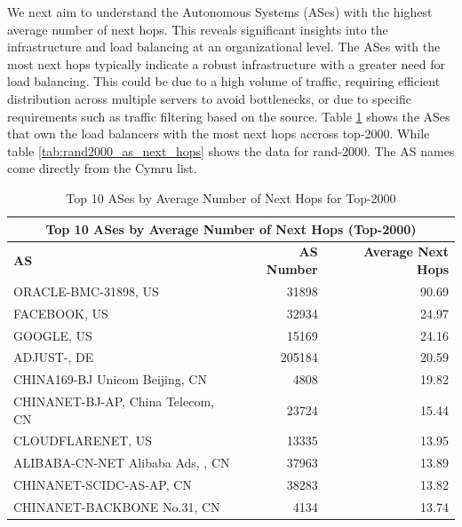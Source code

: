 \documentclass[12pt]{cwru_thesis}
\begin{document}
We next aim to understand the Autonomous Systems (ASes) with the highest average number of next hops.  This reveals significant insights into the infrastructure and load balancing at an organizational level.
The ASes with the most next hops typically indicate a robust infrastructure with a greater need for load balancing. This could be due to a high volume of traffic, requiring efficient distribution across multiple servers to avoid bottlenecks, or due to specific requirements such as traffic filtering based on the source. Table \ref{tab:top2000_as_next_hops} shows the ASes that own the load balancers with the most next hops accross top-2000. While table \ref{tab:rand2000_as_next_hops} shows the data for rand-2000. The AS names come directly from the Cymru list. \\

\begin{table}[h!]
    \centering
    \begin{tabularx}{\textwidth}{|X|r|r|}
        \hline
        \multicolumn{3}{|c|}{\textbf{Top 10 ASes by Average Number of Next Hops (Top-2000)}} \\
        \hline
        \textbf{AS} & \textbf{AS Number} & \textbf{Average Next Hops} \\
        \hline
        ORACLE-BMC-31898, US & 31898 & 90.69 \\
        FACEBOOK, US & 32934 & 24.97 \\
        GOOGLE, US & 15169 & 24.16 \\
        ADJUST-, DE & 205184 & 20.59 \\
        CHINA169-BJ Unicom Beijing, CN & 4808 & 19.82 \\
        CHINANET-BJ-AP, China Telecom, CN & 23724 & 15.44 \\
        CLOUDFLARENET, US & 13335 & 13.95 \\
        ALIBABA-CN-NET Alibaba Ads, , CN & 37963 & 13.89 \\
        CHINANET-SCIDC-AS-AP, CN & 38283 & 13.82 \\
        CHINANET-BACKBONE No.31, CN & 4134 & 13.74 \\
        \hline
    \end{tabularx}
    \caption{Top 10 ASes by Average Number of Next Hops for Top-2000}
    \label{tab:top2000_as_next_hops}
\end{table}
\end{document}
